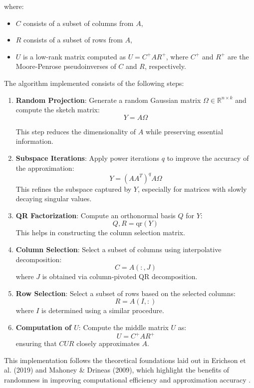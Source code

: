 \documentclass[11pt,a4paper]{article}
\begin{document}
where:
\begin{itemize}
\item $ C $ consists of a subset of columns from $ A $,
\item $ R $ consists of a subset of rows from $ A $,
\item $ U $ is a low-rank matrix computed as $ U = C^+ A R^+ $, where $ C^+ $ and $ R^+ $ are the Moore-Penrose pseudoinverses of $ C $ and $ R $, respectively.
\end{itemize}


The algorithm implemented consists of the following steps:

\begin{enumerate}
\item \textbf{Random Projection}: Generate a random Gaussian matrix $ \Omega \in \mathbb{R}^{n \times k} $ and compute the sketch matrix:
\[
Y = A\Omega
\]

This step reduces the dimensionality of $ A $ while preserving essential information.

\item \textbf{Subspace Iterations}: Apply power iterations $ q $ to improve the accuracy of the approximation:
\[
Y = (A A^T)^q A \Omega
\]
This refines the subspace captured by $ Y $, especially for matrices with slowly decaying singular values.

\item \textbf{QR Factorization}: Compute an orthonormal basis $ Q $ for $ Y $:
\[
Q, R = \text{qr}(Y)
\]
This helps in constructing the column selection matrix.

\item \textbf{Column Selection}: Select a subset of columns using interpolative decomposition:
\[
C = A(:, J)
\]
where $ J $ is obtained via column-pivoted QR decomposition.

\item \textbf{Row Selection}: Select a subset of rows based on the selected columns:
\[
R = A(I, :)
\]
where $ I $ is determined using a similar procedure.

\item \textbf{Computation of $ U $}: Compute the middle matrix $ U $ as:
\[
U = C^+ A R^+
\]
ensuring that $ CUR $ closely approximates $ A $.
\end{enumerate}


This implementation follows the theoretical foundations laid out in Erichson et al. (2019) and Mahoney \& Drineas (2009), which highlight the benefits of randomness in improving computational efficiency and approximation accuracy \cite{Erichson_2019}.
\end{document}
